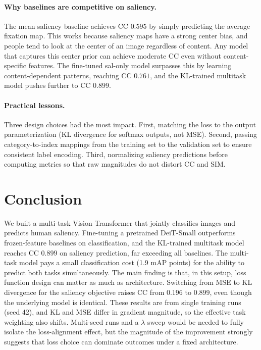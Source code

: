 \documentclass{article}
\begin{document}
\paragraph{Why baselines are competitive on saliency.}
The mean saliency baseline achieves CC $0.595$ by simply predicting the average fixation map. This works because saliency maps have a strong center bias, and people tend to look at the center of an image regardless of content. Any model that captures this center prior can achieve moderate CC even without content-specific features. The fine-tuned sal-only model surpasses this by learning content-dependent patterns, reaching CC $0.761$, and the KL-trained multitask model pushes further to CC $0.899$.

\paragraph{Practical lessons.}
Three design choices had the most impact. First, matching the loss to the output parameterization (KL divergence for softmax outputs, not MSE). Second, passing category-to-index mappings from the training set to the validation set to ensure consistent label encoding. Third, normalizing saliency predictions before computing metrics so that raw magnitudes do not distort CC and SIM.

\section{Conclusion}

We built a multi-task Vision Transformer that jointly classifies images and predicts human saliency. Fine-tuning a pretrained DeiT-Small outperforms frozen-feature baselines on classification, and the KL-trained multitask model reaches CC $0.899$ on saliency prediction, far exceeding all baselines. The multi-task model pays a small classification cost (1.9 mAP points) for the ability to predict both tasks simultaneously. The main finding is that, in this setup, loss function design can matter as much as architecture. Switching from MSE to KL divergence for the saliency objective raises CC from $0.196$ to $0.899$, even though the underlying model is identical. These results are from single training runs (seed 42), and KL and MSE differ in gradient magnitude, so the effective task weighting also shifts. Multi-seed runs and a $\lambda$ sweep would be needed to fully isolate the loss-alignment effect, but the magnitude of the improvement strongly suggests that loss choice can dominate outcomes under a fixed architecture.
\end{document}
